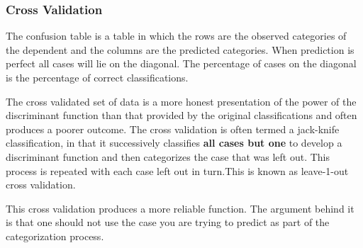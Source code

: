 
\frametitle{Cross Validation}

The confusion
table is a table in which the rows are the observed categories of the dependent and
the columns are the predicted categories. When prediction is perfect all cases will lie on the
diagonal. The percentage of cases on the diagonal is the percentage of correct classifications. 



The cross validated set of data is a more honest presentation of the power of the
discriminant function than that provided by the original classifications and often produces
a poorer outcome. The cross validation is often termed a jack-knife classification, in that
it successively classifies \textbf{all cases but one} to develop a discriminant function and then
categorizes the case that was left out. This process is repeated with each case left out in
turn.This is known as leave-1-out cross validation. 

This cross validation produces a more reliable function. The argument behind it is that
one should not use the case you are trying to predict as part of the categorization process.

